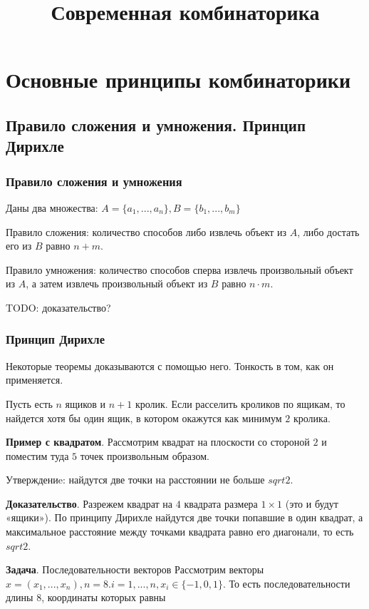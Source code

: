 \documentclass[paper=a4, fontsize=11pt]{scrartcl}
\title{
\huge Современная комбинаторика \\
}
\date{}
\author{}
\begin{document}
\maketitle

\section{Основные принципы комбинаторики}
\subsection{Правило сложения и умножения. Принцип Дирихле}

\subsubsection{Правило сложения и умножения}

Даны два множества: $A = \{a_1, ..., a_n\}, B = \{b_1, ..., b_m\}$

Правило сложения: количество способов либо извлечь объект из $A$, либо достать его из $B$ равно $n + m$.

Правило умножения: количество способов сперва извлечь произвольный объект из $A$, а затем извлечь произвольный объект из $B$ равно $n \cdot m$.

TODO: доказательство?

\subsubsection{Принцип Дирихле}

Некоторые теоремы доказываются с помощью него. Тонкость в том, как он применяется.

Пусть есть $n$ ящиков и $n + 1$ кролик. Если расселить кроликов по ящикам, то найдется хотя бы один ящик, в котором окажутся как минимум $2$ кролика.

\textbf{Пример с квадратом}.
Рассмотрим квадрат на плоскости со стороной $2$ и поместим туда $5$ точек произвольным образом.

Утверждениe: найдутся две точки на расстоянии не больше $sqrt{2}$.

\textbf{Доказательство}. Разрежем квадрат на $4$ квадрата размера $1 \times 1$ (это и будут «ящики»). По принципу Дирихле найдутся две точки попавшие в один квадрат, а максимальное расстояние между точками квадрата равно его диагонали, то есть $sqrt{2}$.

\textbf{Задача}. Последовательности векторов
Рассмотрим векторы $x = (x_1, ..., x_n), n = 8. i = 1, ..., n, x_i \in \{-1, 0, 1\}$. То есть последовательности длины $8$, координаты которых равны 
\end{document}
